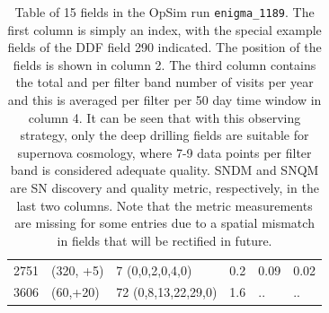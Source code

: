 \begin{center}
\begin{table}
\begin{tabular}{|p{1.3cm} |p{3.3cm}|p{4cm}|p{1.9cm}|p{1.7cm}|p{1.7cm}|}
 2751     & (320, +5) &      7 (0,0,2,0,4,0)      &  0.2 & 0.09 & 0.02\\
 3606     & (60,+20)  &      72 (0,8,13,22,29,0)  &  1.6 &..& ..\\
\hline
\end{tabular}
\caption{Table of 15 fields in the OpSim run \texttt{enigma\_1189}. The first column is simply an
index, with the special example fields of the DDF field 290 indicated. The
position of the fields is shown in column 2. The third column contains the total and per filter
band number of visits per year and this is averaged per filter per 50 day time window in column 4.
It can be seen that with this observing strategy, only the deep drilling fields are suitable for
supernova cosmology, where 7-9 data points per filter band is considered adequate quality. SNDM and
SNQM are SN discovery and quality metric, respectively, in the last two columns. Note that the
metric measurements are missing for some entries due to a spatial mismatch in fields that will be
rectified in future.}
\label{tab:lcpositions}
\end{table}
\end{center}

